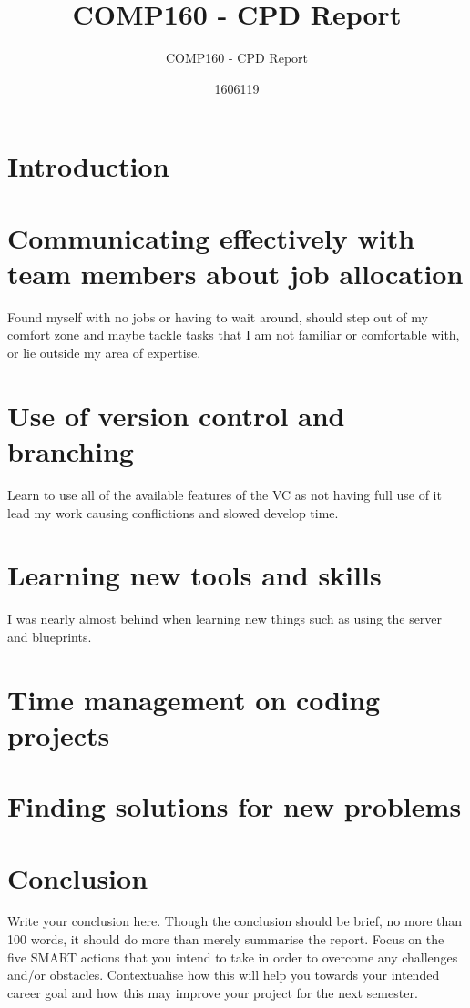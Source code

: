 \documentclass{scrartcl}
\title{COMP160 - CPD Report}
\subtitle{COMP160 - CPD Report}
\author{1606119}
\begin{document}
\maketitle

\section{Introduction}



\section{Communicating effectively with team members about job allocation}
Found myself with no jobs or having to wait around, should step out of my comfort zone and maybe tackle tasks that I am not familiar or comfortable with, or lie outside my area of expertise.


\section{Use of version control and branching}
Learn to use all of the available features of the VC as not having full use of it lead my work causing conflictions and slowed develop time. 


\section{Learning new tools and skills}
I was nearly almost behind when learning new things such as using the server and blueprints. 

\section{Time management on coding projects}


\section{Finding solutions for new problems}


\section{Conclusion}

Write your conclusion here. Though the conclusion should be brief, no more than 100 words, it should do more than merely summarise the report. Focus on the five SMART actions that you intend to take in order to overcome any challenges and/or obstacles. Contextualise how this will help you towards your intended career goal and how this may improve your project for the next semester.





\end{document}

